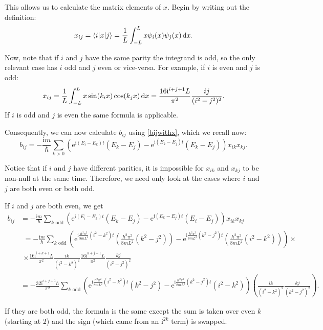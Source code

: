 \documentclass{article}
\newcommand{\e}{\mathrm{e}}
\newcommand{\I}{\mathrm{i}}
\begin{document}
This allows us to calculate the matrix elements of $x$. Begin by writing out the definition:
\begin{equation*}
x_{ij} = \braket{i|x|j} = \frac1{L} \int_{-L}^L x \psi_i(x) \psi_j(x) \dl x.
\end{equation*}

Now, note that if $i$ and $j$ have the same parity the integrand is odd, so the only relevant case has $i$ odd and $j$ even or vice-versa. For example, if $i$ is even and $j$ is odd:
\[
x_{ij} = \frac1{L} \int_{-L}^L x \sin(k_i x) \cos(k_j x) \dl x = \frac{16 \I^{i+j+1} L}{\pi^2} \frac{ij}{(i^2 - j^2)^2}.
\]
If $i$ is odd and $j$ is even the same formula is applicable.

Consequently, we can now calculate $b_{ij}$ using \eqref{bijwithx}, which we recall now:
\[b_{ij} = - \frac{\I m}{\hbar} \sum_{k>0} \left( \e^{\I (E_i - E_k) t} (E_k - E_j) - \e^{\I (E_k - E_j) t} (E_k - E_j) \right) x_{ik} x_{kj}.\]

Notice that if $i$ and $j$ have different parities, it is impossible for $x_{ik}$ and $x_{kj}$ to be non-null at the same time. Therefore, we need only look at the cases where $i$ and $j$ are both even or both odd.

If $i$ and $j$ are both even, we get
\begin{align*}
b_{ij} &= - \frac{\I m}{\hbar} \sum_{\text{$k$ odd}} \left( \e^{\I (E_i - E_k) t} (E_k - E_j) - \e^{\I (E_k - E_j) t} (E_i - E_j) \right) x_{ik} x_{kj}\\
&
\begin{multlined}
= - \frac{\I m}{\hbar} \sum_{\text{$k$ odd}} \left( \e^{\I \frac{\hbar^2 \pi^2}{8m L^2} (i^2 - k^2) t} \left(\frac{\hbar^2 \pi^2}{8m L^2} (k^2 - j^2)\right) - \e^{\I \frac{\hbar^2 \pi^2}{8m L^2} (k^2 - j^2) t} \left(\frac{\hbar^2 \pi^2}{8m L^2} (i^2 - k^2)\right) \right)\times\\
\times \frac{16 \I^{i+k+1} L}{\pi^2} \frac{ik}{(i^2 - k^2)^2} \frac{16 \I^{k+j+1} L}{\pi^2} \frac{kj}{(i^2 - j^2)^2}
\end{multlined}\\
&= -\frac{32 \I^{i+j+1} \hbar}{\pi^2} \sum_{\text{$k$ odd}} \left( \e^{\I \frac{\hbar^2 \pi^2}{8m L^2} (i^2 - k^2) t} (k^2 - j^2) - \e^{\I \frac{\hbar^2 \pi^2}{8m L^2} (k^2 - j^2) t} (i^2 - k^2) \right) \left(\frac{ik}{(i^2 - k^2)^2}\frac{kj}{(k^2 - j^2)^2}\right).
\end{align*}

If they are both odd, the formula is the same except the sum is taken over even $k$ (starting at 2) and the sign (which came from an $\I^{2k}$ term) is swapped.
\end{document}
